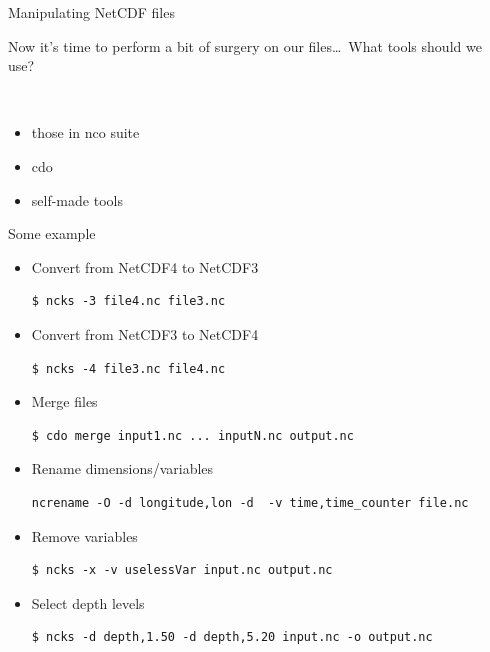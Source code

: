 \documentclass[9pt]{beamer}
\begin{document}
\begin{frame}[fragile]{Manipulating NetCDF files}

Now it's time to perform a bit of surgery on our files\dots\ What tools should we use?

\ 

    \begin{itemize}
        \item<2-> those in nco suite
        \item<3-> cdo
        \item<4-> self-made tools
    \end{itemize}
\end{frame}

\begin{frame}[fragile]{Some example}
    \begin{itemize}
    
        \item Convert from NetCDF4 to NetCDF3
\begin{verbatim}
$ ncks -3 file4.nc file3.nc
\end{verbatim}

        \item Convert from NetCDF3 to NetCDF4
\begin{verbatim}
$ ncks -4 file3.nc file4.nc
\end{verbatim}
    
        \item Merge files
\begin{verbatim}
$ cdo merge input1.nc ... inputN.nc output.nc
\end{verbatim}
        
        \item Rename dimensions/variables
\begin{verbatim}
ncrename -O -d longitude,lon -d  -v time,time_counter file.nc
\end{verbatim}

\item Remove variables
\begin{verbatim}
$ ncks -x -v uselessVar input.nc output.nc
\end{verbatim}

\item Select depth levels
\begin{verbatim}
$ ncks -d depth,1.50 -d depth,5.20 input.nc -o output.nc
\end{verbatim}
        
    \end{itemize}
\end{frame}
\end{document}
